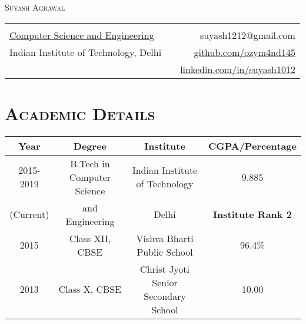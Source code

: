 \documentclass{article}
\newcommand{\tmpsection}[1]{}
\let\tmpsection=\section
\renewcommand{\section}[1]{\tmpsection*{\textsc{#1}}}
\begin{document}

\begin{center}
 {\Large \textsc{Suyash Agrawal} }\\ 
\begin{tabular}{ l p{8cm} r }
    & &   \\
  \href{http://www.cse.iitd.ernet.in/}{Computer Science and Engineering} & & suyash1212@gmail.com \\
  Indian Institute of Technology, Delhi
  & & \href{https://github.com/ozym4nd145/}{github.com/ozym4nd145} \\
  & & \href{https://www.linkedin.com/in/suyash1012}{linkedin.com/in/suyash1012}\\
\end{tabular}
\end{center}


\section{Academic Details}

\begin{center}
\begin{tabular}{ |c | c | c | c |}
\hline
Year & Degree & Institute & CGPA/Percentage \\ 
\hline
2015-2019 & B.Tech in Computer Science & Indian Institute of Technology & 9.885 \\ 
(Current) & and Engineering & Delhi & \textbf{Institute Rank 2}\\
\hline


2015 & Class XII, CBSE & Vishva Bharti Public School & 96.4\% \\ 

\hline
2013 & Class X, CBSE & Christ Jyoti Senior Secondary School & 10.00 \\  \hline
\end{tabular}
\end{center}
\end{document}
